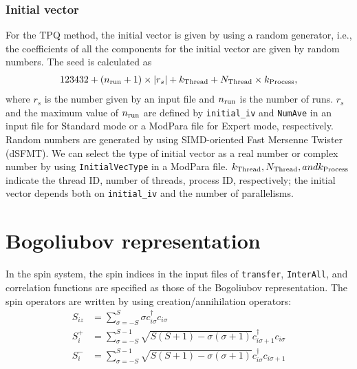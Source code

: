 \subsubsection*{Initial vector}
For the TPQ method, the initial vector is given by using a random generator, i.e., the coefficients of all the components for the initial vector are given by random numbers. The seed is calculated as 
\begin{align}
123432+(n_{\rm run}+1)\times  |r_s|+k_{\rm Thread}+N_{\rm Thread} \times k_{\rm Process},
\end{align}
where $r_s$ is the number given by an input file and $n_{\rm run}$ is the number of runs. $r_s$ and the maximum value of $n_{\rm run}$ are defined by \verb|initial_iv| and \verb|NumAve| in an input file for Standard mode or a ModPara file for Expert mode, respectively. Random numbers are generated by using SIMD-oriented Fast Mersenne Twister (dSFMT)\cite{Mutsuo2008}. We can select the type of initial vector as a real number or complex number by using \verb|InitialVecType| in a ModPara file.
$k_{\rm Thread}, N_{\rm Thread}, and k_{\rm Process}$ indicate 
the thread ID, number of threads, process ID, respectively;
the initial vector depends both on \verb|initial_iv| and the number of parallelisms.

\section{Bogoliubov representation}\label{sec_bogoliubov_rep}

In the spin system,
the spin indices in the input files of \verb|transfer|, \verb|InterAll|,
and correlation functions are specified as those of the Bogoliubov representation.
The spin operators are written by using creation/annihilation operators:
\begin{align}
  S_{i z} &= \sum_{\sigma = -S}^{S} \sigma c_{i \sigma}^\dagger c_{i \sigma}
  \\
  S_{i}^+ &= \sum_{\sigma = -S}^{S-1} 
  \sqrt{S(S+1) - \sigma(\sigma+1)} 
  c_{i \sigma+1}^\dagger c_{i \sigma}
  \\
  S_{i}^- &= \sum_{\sigma = -S}^{S-1} 
  \sqrt{S(S+1) - \sigma(\sigma+1)} 
  c_{i \sigma}^\dagger c_{i \sigma+1}
\end{align}

